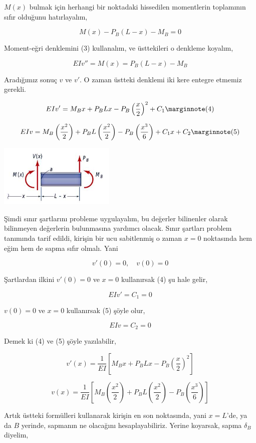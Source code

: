 \documentclass[12pt,fleqn]{article}\usepackage{../../common}
\begin{document}
$M(x)$ bulmak için herhangi bir noktadaki hissedilen momentlerin toplamının
sıfır olduğunu hatırlayalım,

$$
M(x) - P_B(L-x) - M_B = 0
$$

Moment-eğri denklemini (3) kullanalım, ve üsttekileri o denkleme koyalım,

$$
EIv'' = M(x) = P_B(L-x) - M_B
$$

Aradığımız sonuç $v$ ve $v'$. O zaman üstteki denklemi iki kere entegre etmemiz
gerekli.

$$
EI v' = M_B x + P_B Lx - P_B \left( \frac{x}{2} \right)^2 + C_1
\mlabel{4}
$$

$$
EIv = M_B \left( \frac{x^2}{2} \right) +
P_B L  \left( \frac{x^2}{2} \right) -
P_B \left( \frac{x^3}{6} \right) +
C_1 x + C_2
\mlabel{5}
$$

\includegraphics[width=15em]{phy_020_strs_05_05.jpg}

Şimdi sınır şartlarını probleme uygulayalım, bu değerler bilinenler
olarak bilinmeyen değerlerin bulunmasına yardımcı olacak. Sınır şartları
problem tanımında tarif edildi, kirişin bir ucu sabitlenmiş o zaman
$x=0$ noktasında hem eğim hem de sapma sıfır olmalı. Yani

$$
v'(0) = 0,\quad v(0) = 0
$$

Şartlardan ilkini $v'(0)=0$ ve $x=0$ kullanırsak (4) şu hale gelir,

$$
EI v' = C_1 = 0
$$

$v(0)=0$ ve $x=0$ kullanırsak (5) şöyle olur,

$$
EIv = C_2 = 0
$$

Demek ki (4) ve (5) şöyle yazılabilir,

$$
v'(x) = \frac{1}{EI} \left[
  M_B x + P_B Lx - P_B \left( \frac{x}{2} \right)^2
\right]
$$

$$
v(x) = \frac{1}{EI} \left[
  M_B \left( \frac{x^2}{2} \right) + 
  P_B L  \left( \frac{x^2}{2} \right) -
  P_B \left( \frac{x^3}{6} \right)
\right]
$$

Artık üstteki formülleri kullanarak kirişin en son noktasında, yani $x=L$'de, ya
da $B$ yerinde, sapmanın ne olacağını hesaplayabiliriz. Yerine koyarsak, sapma
$\delta_B$ diyelim,
\end{document}

